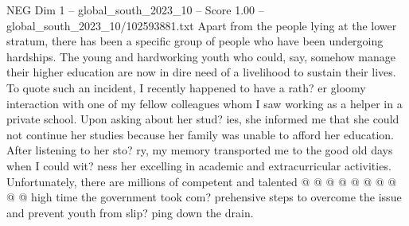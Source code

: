 \begin{textsample}{NEG Dim 1 – global\_south\_2023\_10 – Score 1.00 – global\_south\_2023\_10/102593881.txt}
Apart from the people lying at the lower stratum, there has been a specific group of people who have been undergoing hardships.
The young and hardworking youth who could, say, somehow manage their higher education are now in dire need of a livelihood to sustain their lives.
To quote such an incident, I recently happened to have a rath? er gloomy interaction with one of my fellow colleagues whom I saw working as a helper in a private school.
Upon asking about her stud? ies, she informed me that she could not continue her studies because her family was unable to afford her education.
After listening to her sto? ry, my memory transported me to the good old days when I could wit? ness her excelling in academic and extracurricular activities.
Unfortunately, there are millions of competent and talented @ @ @ @ @ @ @ @ @ @ high time the government took com? prehensive steps to overcome the issue and prevent youth from slip? ping down the drain.

\end{textsample}
